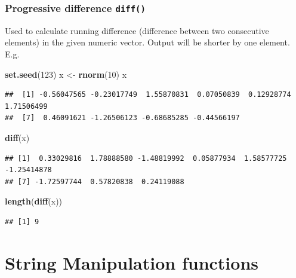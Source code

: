 \documentclass[
]{book}
\newenvironment{Shaded}{\begin{snugshade}}{\end{snugshade}}
\newcommand{\DecValTok}[1]{\textcolor[rgb]{0.00,0.00,0.81}{#1}}
\newcommand{\FunctionTok}[1]{\textcolor[rgb]{0.13,0.29,0.53}{\textbf{#1}}}
\newcommand{\NormalTok}[1]{#1}
\newcommand{\OtherTok}[1]{\textcolor[rgb]{0.56,0.35,0.01}{#1}}
\begin{document}
\hypertarget{progressive-difference-diff}{%
\subsubsection*{\texorpdfstring{Progressive difference \texttt{diff()}}{Progressive difference diff()}}\label{progressive-difference-diff}}

Used to calculate running difference (difference between two consecutive elements) in the given numeric vector. Output will be shorter by one element. E.g.

\begin{Shaded}
\begin{Highlighting}[]
\FunctionTok{set.seed}\NormalTok{(}\DecValTok{123}\NormalTok{)}
\NormalTok{x }\OtherTok{\textless{}{-}} \FunctionTok{rnorm}\NormalTok{(}\DecValTok{10}\NormalTok{)}
\NormalTok{x}
\end{Highlighting}
\end{Shaded}

\begin{verbatim}
##  [1] -0.56047565 -0.23017749  1.55870831  0.07050839  0.12928774  1.71506499
##  [7]  0.46091621 -1.26506123 -0.68685285 -0.44566197
\end{verbatim}

\begin{Shaded}
\begin{Highlighting}[]
\FunctionTok{diff}\NormalTok{(x)}
\end{Highlighting}
\end{Shaded}

\begin{verbatim}
## [1]  0.33029816  1.78888580 -1.48819992  0.05877934  1.58577725 -1.25414878
## [7] -1.72597744  0.57820838  0.24119088
\end{verbatim}

\begin{Shaded}
\begin{Highlighting}[]
\FunctionTok{length}\NormalTok{(}\FunctionTok{diff}\NormalTok{(x))}
\end{Highlighting}
\end{Shaded}

\begin{verbatim}
## [1] 9
\end{verbatim}

\hypertarget{string-manipulation-functions}{%
\section{String Manipulation functions}\label{string-manipulation-functions}}
\end{document}
